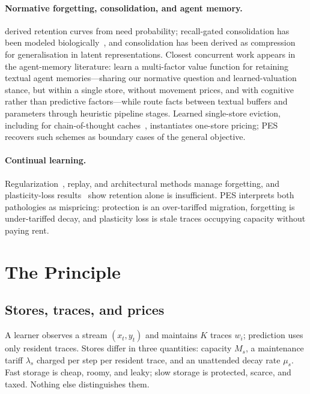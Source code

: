 \documentclass[11pt]{article}
\begin{document}
\paragraph{Normative forgetting, consolidation, and agent memory.}
\citet{anderson1991rational} derived retention curves from need probability; recall-gated
consolidation has been modeled biologically~\citep{gershman2025recallgated}, and consolidation has been
derived as compression for generalisation in latent representations. Closest concurrent work appears in
the agent-memory literature: \citet{chen2026learning} learn a multi-factor value function for retaining
textual agent memories---sharing our normative question and learned-valuation stance, but within a
single store, without movement prices, and with cognitive rather than predictive factors---while
\citet{li2026duallayer} route facts between textual buffers and parameters through heuristic pipeline
stages. Learned single-store eviction, including for chain-of-thought caches~\citep{zhang2025obcache,
li2026ngc}, instantiates one-store pricing; PES recovers such schemes as boundary cases of the general
objective.

\paragraph{Continual learning.}
Regularization~\citep{kirkpatrick2017ewc,zenke2017si}, replay, and architectural methods manage
forgetting, and plasticity-loss results~\citep{dohare2024plasticity} show retention alone is
insufficient. PES interprets both pathologies as mispricing: protection is an over-tariffed migration,
forgetting is under-tariffed decay, and plasticity loss is stale traces occupying capacity without
paying rent.
\section{The Principle}
\label{sec:principle}

\subsection{Stores, traces, and prices}
A learner observes a stream $(x_t, y_t)$ and maintains $K$ traces $w_i$; prediction uses only resident
traces. Stores differ in three quantities: capacity $M_s$, a maintenance tariff $\lambda_s$ charged per
step per resident trace, and an unattended decay rate $\mu_s$. Fast storage is cheap, roomy, and leaky;
slow storage is protected, scarce, and taxed. Nothing else distinguishes them.
\end{document}
